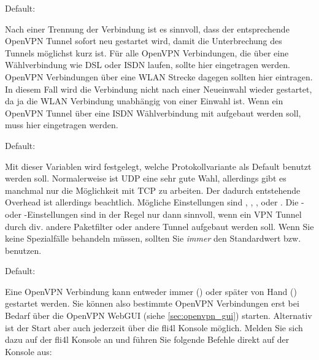 \begin{description}

  Default: 

  Nach einer Trennung der Verbindung ist es sinnvoll, dass der
  entsprechende OpenVPN Tunnel sofort neu gestartet wird, damit die
  Unterbrechung des Tunnels möglichst kurz ist.  Für alle OpenVPN
  Verbindungen, die über eine Wählverbindung wie DSL oder ISDN laufen,
  sollte hier  eingetragen werden. OpenVPN Verbindungen
  über eine WLAN Strecke dagegen sollten hier 
  eintragen. In diesem Fall wird die Verbindung nicht nach einer
  Neueinwahl wieder gestartet, da ja die WLAN Verbindung unabhängig
  von einer Einwahl ist. Wenn ein OpenVPN Tunnel über eine ISDN
  Wählverbindung mit  aufgebaut werden
  soll, muss hier  eingetragen werden.


  Default: 

  Mit dieser Variablen wird festgelegt, welche Protokollvariante als
  Default benutzt werden soll. Normalerweise ist UDP eine sehr gute
  Wahl, allerdings gibt es manchmal nur die Möglichkeit mit TCP zu
  arbeiten. Der dadurch entstehende Overhead ist allerdings
  beachtlich. Mögliche Einstellungen sind , 
  , ,  oder .
  Die - oder -Einstellungen sind in der Regel nur dann
  sinnvoll, wenn ein VPN Tunnel durch div. andere Paketfilter oder
  andere Tunnel aufgebaut werden soll. Wenn Sie keine Spezialfälle
  behandeln müssen, sollten Sie \emph{immer} den Standardwert
   bzw.\  benutzen.
  

  Default: 

  Eine OpenVPN Verbindung kann entweder immer () oder
  später von Hand () gestartet werden. Sie können
  also bestimmte OpenVPN Verbindungen erst bei Bedarf über die OpenVPN
  WebGUI (siehe \ref{sec:openvpn_gui}) starten. Alternativ ist der
  Start aber auch jederzeit über die fli4l Konsole möglich. Melden Sie
  sich dazu auf der fli4l Konsole an und führen Sie folgende Befehle
  direkt auf der Konsole aus:


\end{description}
